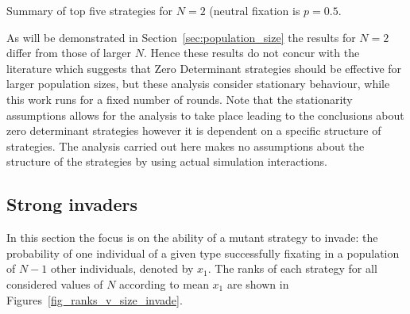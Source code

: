 \documentclass{article}
\begin{document}
\begin{table}[!hbtp]
    \centering
    
    \caption{Summary of top five strategies for \(N=2\) (neutral fixation is $p=0.5$.}
    \label{tbl:summary_top_2}
\end{table}

As will be demonstrated in Section~\ref{sec:population_size} the results for
\(N=2\) differ from those of larger $N$. Hence these results do not concur with
the literature which suggests that Zero Determinant strategies should be
effective for larger population sizes, but these analysis consider stationary
behaviour, while this work runs for a fixed number of rounds. Note that the
stationarity assumptions allows for the analysis to take place leading to the
conclusions about zero determinant strategies however it is dependent on a
specific structure of strategies. The analysis carried out here makes no
assumptions about the structure of the strategies by using actual simulation
interactions. \cite{Stewart...}


\subsection{Strong invaders}\label{sec:strong_invaders}

In this section the focus is on the ability of a mutant strategy to invade: the
probability of one individual of a given type successfully fixating in a
population of \(N - 1\) other individuals, denoted by \(x_1\).
The ranks of each strategy for all considered values of \(N\) according to mean
\(x_1\) are shown in Figures~\ref{fig_ranks_v_size_invade}.
\end{document}

